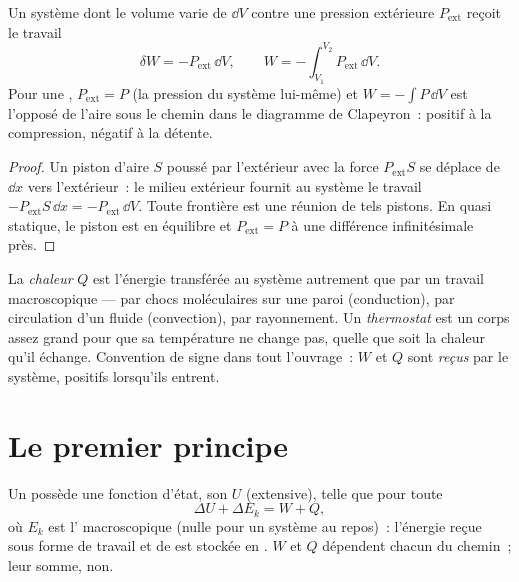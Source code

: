 \begin{proposition}\label{prop:b1:first-law:work}
Un système dont le volume varie de $\dd V$ contre une pression extérieure
$P_{\mathrm{ext}}$ reçoit le travail
\[
\delta W = -P_{\mathrm{ext}}\,\dd V, \qquad
W = -\int_{V_1}^{V_2}P_{\mathrm{ext}}\,\dd V .
\]
Pour une , $P_{\mathrm{ext}} = P$ (la pression
du système lui-même) et $W = -\int P\,\dd V$ est l'opposé de l'aire sous le
chemin dans le diagramme de Clapeyron~: positif à la compression, négatif
à la détente.
\end{proposition}

\begin{proof}
Un piston d'aire $S$ poussé par l'extérieur avec la force
$P_{\mathrm{ext}}S$ se déplace de $\dd x$ vers l'extérieur~: le milieu
extérieur fournit au système le travail
$-P_{\mathrm{ext}}S\,\dd x = -P_{\mathrm{ext}}\,\dd V$. Toute frontière est
une réunion de tels pistons. En quasi statique, le piston est en équilibre
et $P_{\mathrm{ext}} = P$ à une différence infinitésimale près.
\end{proof}

\begin{definition}[Chaleur]\label{def:b1:first-law:heat}
La \emph{chaleur} $Q$ est l'énergie transférée au système autrement que par
un travail macroscopique --- par chocs moléculaires sur une paroi
(conduction), par circulation d'un fluide (convection), par rayonnement. Un
\emph{thermostat} est un corps assez grand pour que sa température ne change
pas, quelle que soit la chaleur qu'il échange. Convention de signe dans tout
l'ouvrage~: $W$ et $Q$ sont \emph{reçus} par le système, positifs lorsqu'ils entrent.
\end{definition}

\section{Le premier principe}

\begin{theorem}\label{thm:b1:first-law:firstlaw}
Un  possède une fonction d'état, son \emph{}
$U$ (extensive), telle que pour toute 
\[
\Delta U + \Delta E_{k} = W + Q ,
\]
où $E_k$ est l' macroscopique (nulle pour un système au
repos)~: l'énergie reçue sous forme de travail et de  est stockée en
. $W$ et $Q$ dépendent chacun du chemin~; leur somme, non.
\end{theorem}
\admitted

